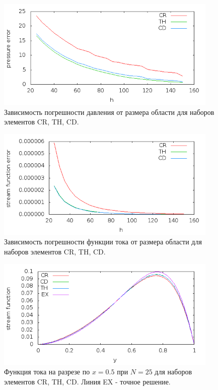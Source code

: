 \documentclass[12pt]{article}
\begin{document}
\begin{figure}
	\begin{center}
		\includegraphics[width=400px]{pics/p_err}
		\caption{Зависимость погрешности давления от размера области для наборов элементов CR, TH, CD.}
		\label{fg:p_err}
	\end{center}
\end{figure}

\begin{figure}
	\begin{center}
		\includegraphics[width=400px]{pics/psi_err}
		\caption{Зависимость погрешности функции тока от размера области для наборов элементов CR, TH, CD.}
		\label{fg:psi_err}
	\end{center}
\end{figure}

\begin{figure}
	\begin{center}
		\includegraphics[width=400px]{pics/psi_25}
		\caption{Функция тока на разрезе по $x=0.5$ при $N=25$ для наборов элементов CR, TH, CD. Линия EX - точное решение.}
		\label{fg:psi_25}
	\end{center}
\end{figure}
\end{document}
